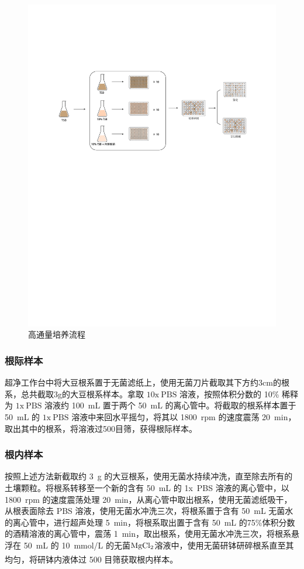 \documentclass[UTF8]{ctexart}
\begin{document}
    \begin{figure}
        \centering
        \includegraphics[width=\textwidth]{img/CulturePipeline.pdf}
        \caption{高通量培养流程}
    \end{figure}

    \subsubsection{根际样本}
        超净工作台中将大豆根系置于无菌滤纸上，使用无菌刀片截取其下方约3cm的根系，总共截取3g的大豆根系样本。拿取 $\mathrm{10x~PBS}$ 溶液，按照体积分数的 10\% 稀释为 $\mathrm{1x~ PBS}$ 溶液约 100~mL 置于两个 50~mL 的离心管中。将截取的根系样本置于 50~mL 的 $\mathrm{1x~ PBS}$ 溶液中来回水平摇匀，将其以 1800~rpm 的速度震荡 20~min，取出其中的根系，将溶液过500目筛，获得根际样本。

    \subsubsection{根内样本}
        按照上述方法新截取约 3~g 的大豆根系，使用无菌水持续冲洗，直至除去所有的土壤颗粒。将根系转移至一个新的含有 50~mL 的 1x~PBS 溶液的离心管中，以 1800~rpm 的速度震荡处理 20~min，从离心管中取出根系，使用无菌滤纸吸干，从根表面除去 PBS 溶液，使用无菌水冲洗三次，将根系置于含有 50~mL 无菌水的离心管中，进行超声处理 5~min，将根系取出置于含有 50~mL 的75\%体积分数的酒精溶液的离心管中，震荡 1~min，取出根系，使用无菌水冲洗三次，将根系悬浮在 50~mL 的 10~mmol/L 的无菌$\ce{MgCl2}$溶液中，使用无菌研钵研碎根系直至其均匀，将研钵内液体过 500 目筛获取根内样本\textsuperscript{\cite{ref2}}。
\end{document}
